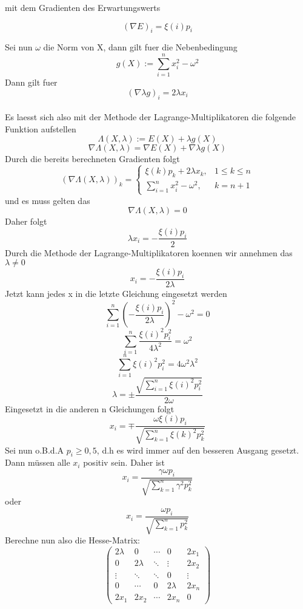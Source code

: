 \documentclass[11pt]{scrartcl}
\begin{document}
			mit dem Gradienten des Erwartungswerts
			\begin{center}
				\[(\nabla E)_{i}=\xi(i)p_{i}\]
			\end{center}
			Sei nun \(\omega\) die Norm von X, dann gilt fuer die Nebenbedingung
			\[g(X):=\sum_{i=1}^{n}x_{i}^2-{\omega}^2\]
			Dann gilt fuer \[(\nabla \lambda g)_{i} = 2\lambda x_{i}\]\\
			Es laesst sich also mit der Methode der Lagrange-Multiplikatoren die folgende Funktion aufstellen \[\Lambda(X,\lambda) := E(X)+\lambda g(X)\]
			\[\nabla \Lambda(X,\lambda) = \nabla E(X) + \nabla \lambda g(X)\]
			Durch die bereits berechneten Gradienten folgt
			\[(\nabla \Lambda (X,\lambda))_{k}=
				\begin{cases}
					\xi (k)p_{k}+2\lambda x_{k}, & 1\leq k\leq n\\
					\sum_{i=1}^{n}x_{i}^2-\omega^2, & k = n+1
				\end{cases}\]
			und es muss gelten das
			\[\nabla \Lambda(X,\lambda)=0\]
			Daher folgt
			\[\lambda x_{i} = -\frac{\xi(i)p_{i}}{2}\]
			Durch die Methode der Lagrange-Multiplikatoren koennen wir annehmen das \(\lambda \neq 0\)
			\[x_{i}= -\frac{\xi(i)p_{i}}{2\lambda}\]
			Jetzt kann jedes x in die letzte Gleichung eingesetzt werden
			\[\sum_{i=1}^{n}(-\frac{\xi(i)p_{i}}{2\lambda})^2-\omega^2=0\]
			\[\sum_{i=1}^{n}\frac{\xi(i)^2p_{i}^2}{4\lambda^2}=\omega^2\]
			\[\sum_{i=1}^{n}\xi(i)^2p_{i}^2=4\omega^2\lambda^2\]
			\[\lambda = \pm\frac{\sqrt{\sum_{i=1}^{n}\xi(i)^2p_{i}^2}}{2\omega}\]
			Eingesetzt in die anderen n Gleichungen folgt
			\[x_{i}=\mp\frac{\omega\xi(i)p_{i}}{\sqrt{\sum_{k=1}^{n}\xi(k)^2p_{k}^2}}\]
			Sei nun o.B.d.A \(p_{i}\geq0,5\), d.h es wird immer auf den besseren Ausgang gesetzt. Dann müssen alle \(x_{i}\) positiv sein. Daher ist
			$$
			x_{i}=\frac{\gamma\omega p_{i}}{\sqrt{\sum_{k=1}^{n}\gamma^2p_{k}^2}}
			$$
			oder
			$$
			x_{i}=\frac{\omega p_{i}}{\sqrt{\sum_{k=1}^{n}p_{k}^2}}
			$$
			Berechne nun also die Hesse-Matrix:
			$$
			\left(
			\begin{array}{ccccc}
				2\lambda & 0 & \cdots & 0 & 2x_{1} \\
				0 & 2\lambda & \ddots & \vdots & 2x_{2} \\
				\vdots & \ddots & \ddots & 0 & \vdots \\
				0 & \cdots & 0 & 2\lambda & 2x_{n} \\
				2x_{1} & 2x_{2} & \cdots & 2x_{n} & 0
			\end{array}
			\right)
			$$
\end{document}
